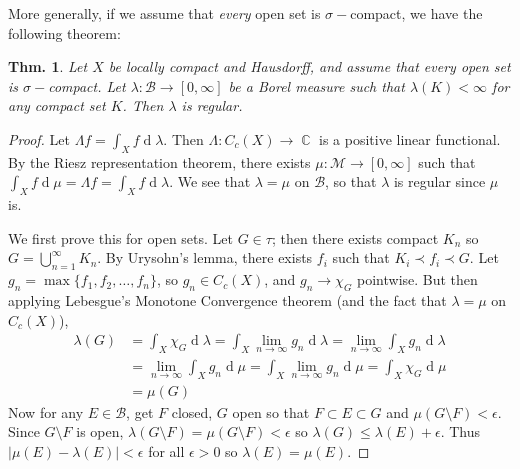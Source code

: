 \documentclass[12pt, a4paper]{book}
\DeclareMathOperator{\C}{\mathbb{C}}
\renewcommand{\d}[1]{\ensuremath{\operatorname{d}\!{#1}}} %
\newtheorem{theorem}{Thm.}[section]
\theoremstyle{nonumberplain}
\newtheorem{proof}{Proof}
\begin{document}
More generally, if we assume that \textit{every} open set is $\sigma-$compact, we have the following theorem:
\begin{theorem}
    Let $X$ be locally compact and Hausdorff, and assume that every open set is $\sigma-$compact.
    Let $\lambda:\mathcal{B}\to[0,\infty]$ be a Borel measure such that $\lambda(K)<\infty$ for any compact set $K$.
    Then $\lambda$ is regular.
\end{theorem}
\begin{proof}
    Let $\Lambda f=\int_X f\d{\lambda}$.
    Then $\Lambda:C_c(X)\to\C$ is a positive linear functional.
    By the Riesz representation theorem, there exists $\mu:\mathcal{M}\to[0,\infty]$ such that $\int_Xf\d{\mu}=\Lambda f=\int_Xf\d{\lambda}$.
    We see that $\lambda=\mu$ on $\mathcal{B}$, so that $\lambda$ is regular since $\mu$ is.

    We first prove this for open sets.
    Let $G\in\tau$; then there exists compact $K_n$ so $G=\bigcup_{n=1}^\infty K_n$.
    By Urysohn's lemma, there exists $f_i$ such that $K_i\prec f_i\prec G$.
    Let $g_n=\max\{f_1,f_2,\ldots,f_n\}$, so $g_n\in C_c(X)$, and $g_n\to\chi_G$ pointwise.
    But then applying Lebesgue's Monotone Convergence theorem (and the fact that $\lambda=\mu$ on $C_c(X)$),
    \begin{align*}
        \lambda(G) &= \int_X\chi_G\d{\lambda}= \int_X\lim_{n\to\infty}g_n\d{\lambda}= \lim_{n\to\infty}\int_X g_n\d{\lambda}\\
                   &= \lim_{n\to\infty}\int_X g_n\d{\mu}= \int_X\lim_{n\to\infty}g_n\d{\mu}= \int_X\chi_G\d{\mu}\\
                   &=\mu(G)
    \end{align*}
    Now for any $E\in\mathcal{B}$, get $F$ closed, $G$ open so that $F\subset E\subset G$ and $\mu(G\setminus F)<\epsilon$.
    Since $G\setminus F$ is open, $\lambda(G\setminus F)=\mu(G\setminus F)<\epsilon$ so $\lambda(G)\leq\lambda(E)+\epsilon$.
    Thus $|\mu(E)-\lambda(E)|<\epsilon$ for all $\epsilon>0$ so $\lambda(E)=\mu(E)$.
\end{proof}
\end{document}
